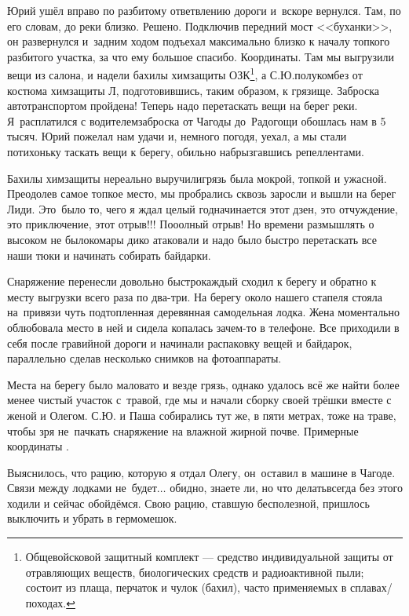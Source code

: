 \renewcommand*{\thefootnote}{\fnsymbol{footnote}}
Юрий ушёл вправо по разбитому ответвлению дороги и~вскоре вернулся. Там, по его словам, до реки близко. Решено. Подключив передний мост <<буханки>>, он развернулся и~задним ходом подъехал максимально близко к началу топкого разбитого участка, за что ему большое спасибо. Координаты\mdash \CoordsLidSeventeenStapel. Там мы выгрузили вещи из салона, и надели бахилы химзащиты ОЗК\footnote[1]{Общевойсковой защитный комплект --- средство индивидуальной защиты от отравляющих веществ, биологических средств и радиоактивной пыли; состоит из плаща, перчаток и чулок (бахил), часто применяемых в сплавах/походах.}, а С.Ю.\mdash полукомбез от костюма химзащиты Л, подготовившись, таким образом, к грязище. Заброска автотранспортом пройдена! Теперь надо перетаскать вещи на берег реки. Я~расплатился с водителем\mdash заброска от Чагоды до~Радогощи обошлась нам в 5 тысяч. Юрий пожелал нам удачи и, немного погодя, уехал, а мы стали потихоньку таскать вещи к берегу, обильно набрызгавшись репеллентами.

Бахилы химзащиты нереально выручили\mdash грязь была мокрой, топкой и ужасной. Преодолев самое топкое место, мы пробрались сквозь заросли и вышли на берег Лиди. Это~было то, чего я ждал целый год\mdash начинается этот дзен, это отчуждение, это приключение, этот отрыв!!! По\sdash о\sdash олный отрыв! Но времени размышлять о высоком не было\mdash комары дико атаковали и надо было быстро перетаскать все наши тюки и начинать собирать байдарки. 

Снаряжение перенесли довольно быстро\mdash каждый сходил к берегу и обратно к месту выгрузки всего раза по два-три. На берегу около нашего стапеля стояла на~привязи чуть подтопленная деревянная самодельная лодка. Жена моментально облюбовала место в ней и сидела копалась зачем-то в телефоне. Все приходили в себя после гравийной дороги и начинали распаковку вещей и байдарок, параллельно сделав несколько снимков на фотоаппараты. 

Места на берегу было маловато и везде грязь, однако удалось всё же найти более менее чистый участок с~травой, где мы и начали сборку своей трёшки вместе с женой и Олегом. С.Ю. и Паша собирались тут же, в пяти метрах, тоже на траве, чтобы зря не~пачкать снаряжение на влажной жирной почве. Примерные координаты \CoordsLidSeventeenStapel.

Выяснилось, что рацию, которую я отдал Олегу, он~оставил в машине в Чагоде. Связи между лодками не~будет$\ldots$ обидно, знаете ли, но что делать\mdash всегда без этого ходили и сейчас обойдёмся. Свою рацию, ставшую бесполезной, пришлось выключить и убрать в гермомешок.

